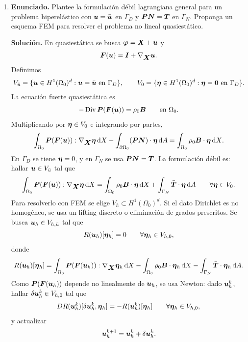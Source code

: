 \documentclass[11pt]{article}
\def\vec   #1{\mbox{\boldmath $#1$}{}}
\def\ten   #1{\mbox{\boldmath $#1$}{}}
\def\dX{\mbox{\(\,\mathrm{d}X\)}}
\def\dA{\mbox{\(\,\mathrm{d}A\)}}
\DeclareMathOperator{\Div}{Div}
\begin{document}
\begin{enumerate}[label=\textbf{\arabic*.}, leftmargin=*]
\begin{enumerate}[label=(\alph*), leftmargin=*]
    \item \textbf{Enunciado.} Plantee la formulación débil lagrangiana general para un problema hiperelástico con $\vec u=\bar{\vec u}$ en $\Gamma_D$ y $\ten P\vec N=\bar{\vec T}$ en $\Gamma_N$. Proponga un esquema FEM para resolver el problema no lineal quasiestático.

    \textbf{Solución.} En quasiestática se busca $\vec\varphi=\vec X+\vec u$ y
    \[
        \ten F(\vec u)=\ten I+\nabla_{\vec X}\vec u.
    \]
    Definimos
    \[
        V_{\bar u}=\{\vec u\in H^1(\Omega_0)^d:\vec u=\bar{\vec u}\text{ en }\Gamma_D\},
        \qquad
        V_0=\{\vec\eta\in H^1(\Omega_0)^d:\vec\eta=\vec0\text{ en }\Gamma_D\}.
    \]
    La ecuación fuerte quasiestática es
    \[
        -\Div\ten P(\ten F(\vec u))=\rho_0\vec B
        \qquad\text{en }\Omega_0.
    \]
    Multiplicando por $\vec\eta\in V_0$ e integrando por partes,
    \[
    \begin{aligned}
        \int_{\Omega_0}\ten P(\ten F(\vec u)):\nabla_{\vec X}\vec\eta\dX
        -\int_{\partial\Omega_0}(\ten P\vec N)\cdot\vec\eta\dA
        =
        \int_{\Omega_0}\rho_0\vec B\cdot\vec\eta\dX.
    \end{aligned}
    \]
    En $\Gamma_D$ se tiene $\vec\eta=0$, y en $\Gamma_N$ se usa $\ten P\vec N=\bar{\vec T}$. La formulación débil es: hallar $\vec u\in V_{\bar u}$ tal que
    \[
        \int_{\Omega_0}\ten P(\ten F(\vec u)):\nabla_{\vec X}\vec\eta\dX
        =
        \int_{\Omega_0}\rho_0\vec B\cdot\vec\eta\dX
        +
        \int_{\Gamma_N}\bar{\vec T}\cdot\vec\eta\dA
        \qquad\forall\vec\eta\in V_0.
    \]
    Para resolverlo con FEM se elige $V_h\subset H^1(\Omega_0)^d$. Si el dato Dirichlet es no homogéneo, se usa un lifting discreto o eliminación de grados prescritos. Se busca $\vec u_h\in V_{h,\bar u}$ tal que
    \[
        R(\vec u_h)[\vec\eta_h]=0
        \qquad\forall\vec\eta_h\in V_{h,0},
    \]
    donde
    \[
        R(\vec u_h)[\vec\eta_h]
        =
        \int_{\Omega_0}\ten P(\ten F(\vec u_h)):\nabla_{\vec X}\vec\eta_h\dX
        -
        \int_{\Omega_0}\rho_0\vec B\cdot\vec\eta_h\dX
        -
        \int_{\Gamma_N}\bar{\vec T}\cdot\vec\eta_h\dA.
    \]
    Como $\ten P(\ten F(\vec u_h))$ depende no linealmente de $\vec u_h$, se usa Newton: dado $\vec u_h^k$, hallar $\delta\vec u_h^k\in V_{h,0}$ tal que
    \[
        DR(\vec u_h^k)[\delta\vec u_h^k,\vec\eta_h]
        =
        -R(\vec u_h^k)[\vec\eta_h]
        \qquad\forall\vec\eta_h\in V_{h,0},
    \]
    y actualizar
    \[
        \vec u_h^{k+1}=\vec u_h^k+\delta\vec u_h^k.
    \]
\end{enumerate}


\end{enumerate}
\end{document}
